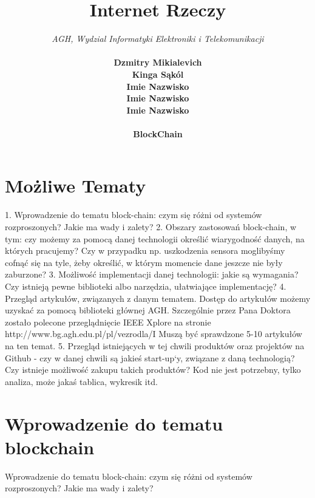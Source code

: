 \documentclass[12pt]{article}
\begin{document}
\title{Internet Rzeczy}
\author{
  \textit{AGH, Wydzial Informatyki Elektroniki i Telekomunikacji} \\ \\
  \textbf{Dzmitry Mikialevich}\\
  \textbf{Kinga Sąkól}\\
  \textbf{Imie Nazwisko}\\
  \textbf{Imie Nazwisko}\\
  \textbf{Imie Nazwisko}\\ \\
  \textbf{BlockChain}
}
\date{ }
\maketitle
\tableofcontents

\newpage

\section{Możliwe Tematy}
1. Wprowadzenie do tematu block-chain: czym się różni od systemów rozproszonych? Jakie ma wady i zalety?
2. Obszary zastosowań block-chain, w tym: czy możemy za pomocą danej technologii określić wiarygodność danych,
na których pracujemy? Czy w przypadku np. uszkodzenia sensora moglibyśmy cofnąć się na tyle, żeby określić, w którym momencie dane jeszcze nie były zaburzone?
3. Możliwość implementacji danej technologii: jakie są wymagania? Czy istnieją pewne biblioteki albo narzędzia, ułatwiające implementację?
4. Przegląd artykułów, związanych z danym tematem. Dostęp do artykułów możemy uzyskać za pomocą biblioteki głównej AGH. Szczególnie przez Pana Doktora zostało polecone przeglądnięcie IEEE Xplore na stronie http://www.bg.agh.edu.pl/pl/vezrodla/I
Muszą być sprawdzone 5-10 artykułów na ten temat.
5. Przegląd istniejących w tej chwili produktów oraz projektów na Github - czy w danej chwili są jakieś start-up`y, związane z daną technologią? Czy istnieje możliwość zakupu takich produktów? Kod nie jest potrzebny, tylko analiza, może jakaś tablica, wykresik itd.

\section{Wprowadzenie do tematu blockchain}

Wprowadzenie do tematu block-chain: czym się różni od systemów rozproszonych? Jakie ma wady i zalety?
\end{document}
